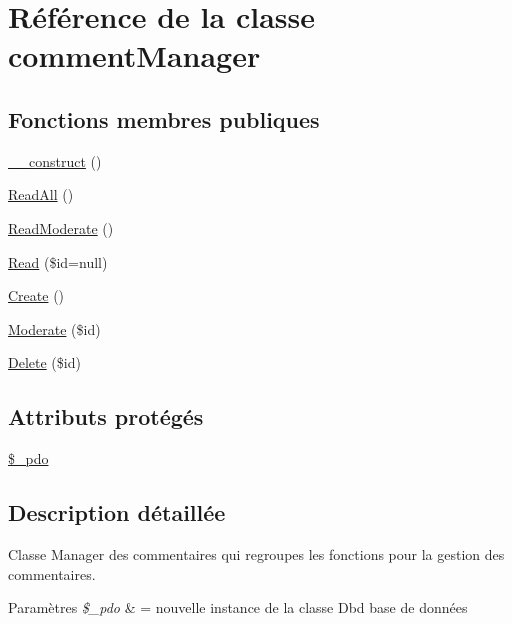 \hypertarget{class_src_1_1_managers_1_1comment_manager}{}\section{Référence de la classe comment\+Manager}
\label{class_src_1_1_managers_1_1comment_manager}
\subsection*{Fonctions membres publiques}
\begin{DoxyCompactItemize}
\item 
\hyperlink{class_src_1_1_managers_1_1comment_manager_a095c5d389db211932136b53f25f39685}{\+\_\+\+\_\+construct} ()
\item 
\hyperlink{class_src_1_1_managers_1_1comment_manager_a24f9f6fa83eb8694eab0a87b2e6ad0b1}{Read\+All} ()
\item 
\hyperlink{class_src_1_1_managers_1_1comment_manager_a4224d6d3de965c48624a2c530d0a2c94}{Read\+Moderate} ()
\item 
\hyperlink{class_src_1_1_managers_1_1comment_manager_af0b2d518844625de0b1fe21ebb8e6c58}{Read} (\$id=null)
\item 
\hyperlink{class_src_1_1_managers_1_1comment_manager_ad01f71fa0ecc039494e3c282864298c3}{Create} ()
\item 
\hyperlink{class_src_1_1_managers_1_1comment_manager_a511df177d885f133ac59c2b68c7046f2}{Moderate} (\$id)
\item 
\hyperlink{class_src_1_1_managers_1_1comment_manager_a59113b5ecd1d155db6a4f30af34a1e80}{Delete} (\$id)
\end{DoxyCompactItemize}
\subsection*{Attributs protégés}
\begin{DoxyCompactItemize}
\item 
\hyperlink{class_src_1_1_managers_1_1comment_manager_a1e6d977917b70dce7e26cebad8438bf4}{\$\+\_\+pdo}
\end{DoxyCompactItemize}


\subsection{Description détaillée}
Classe Manager des commentaires qui regroupes les fonctions pour la gestion des commentaires. 
\begin{DoxyParams}{Paramètres}
{\em \$\+\_\+pdo} & = nouvelle instance de la classe Dbd base de données \\
\hline
\end{DoxyParams}


